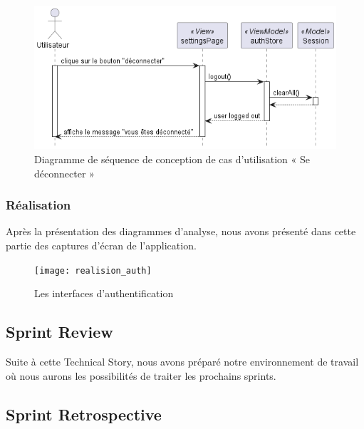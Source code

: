 \begin{figure}[H]
  \centering
  \includegraphics[width=1\textwidth]{out/diagrams/authentification/sequence_logout/sequence_logout}
  \caption{Diagramme de séquence de conception de cas d'utilisation « Se déconnecter »}
  \label{fig:sequence_conception_logout}
\end{figure}

\subsubsection{Réalisation}

Après la présentation des diagrammes d'analyse, nous avons présenté dans cette partie des captures d'écran de l'application.

\begin{figure}[H]
  \centering
  \texttt{[image: realision\_auth]}
  \caption{Les interfaces d'authentification}
  \label{fig:realision_auth}
\end{figure}

\subsection{Sprint Review}
Suite à cette Technical Story, nous avons préparé notre environnement de travail où nous aurons les possibilités de traiter les prochains sprints.

\subsection{Sprint Retrospective}

